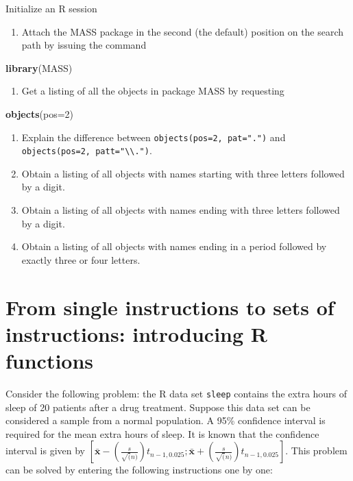 \documentclass[
]{book}
\newenvironment{Shaded}{\begin{snugshade}}{\end{snugshade}}
\newcommand{\AttributeTok}[1]{\textcolor[rgb]{0.13,0.29,0.53}{#1}}
\newcommand{\DecValTok}[1]{\textcolor[rgb]{0.00,0.00,0.81}{#1}}
\newcommand{\FunctionTok}[1]{\textcolor[rgb]{0.13,0.29,0.53}{\textbf{#1}}}
\newcommand{\NormalTok}[1]{#1}
\providecommand{\tightlist}{%
  \setlength{\itemsep}{0pt}\setlength{\parskip}{0pt}}
\begin{document}
Initialize an R session

\begin{enumerate}
\def\labelenumi{(\alph{enumi})}
\tightlist
\item
  Attach the MASS package in the second (the default) position on the search path by issuing the command
\end{enumerate}

\begin{Shaded}
\begin{Highlighting}[]
\FunctionTok{library}\NormalTok{(MASS)}
\end{Highlighting}
\end{Shaded}

\begin{enumerate}
\def\labelenumi{(\alph{enumi})}
\setcounter{enumi}{1}
\tightlist
\item
  Get a listing of all the objects in package MASS by requesting
\end{enumerate}

\begin{Shaded}
\begin{Highlighting}[]
\FunctionTok{objects}\NormalTok{(}\AttributeTok{pos=}\DecValTok{2}\NormalTok{)}
\end{Highlighting}
\end{Shaded}

\begin{enumerate}
\def\labelenumi{(\alph{enumi})}
\setcounter{enumi}{2}
\tightlist
\item
  Explain the difference between \texttt{objects(pos=2,\ pat=".")} and \texttt{objects(pos=2,\ patt="\textbackslash{}\textbackslash{}.")}.
\item
  Obtain a listing of all objects with names starting with three letters followed by a digit.
\item
  Obtain a listing of all objects with names ending with three letters followed by a digit.
\item
  Obtain a listing of all objects with names ending in a period followed by exactly three or four letters.
\end{enumerate}

\section{From single instructions to sets of instructions: introducing R functions}\label{FunctionIntro}

Consider the following problem: the R data set \texttt{sleep} contains the extra hours of sleep of 20 patients after a drug treatment. Suppose this data set can be considered a sample from a normal population. A 95\% confidence interval is required for the mean extra hours of sleep. It is known that the confidence interval is given by \(\left[ \mathbf{\bar{x}}- \left( \frac{s}{\sqrt(n)} \right) t_{n-1,0.025}; \mathbf{\bar{x}}+ \left( \frac{s}{\sqrt(n)} \right) t_{n-1,0.025} \right]\). This problem can be solved by entering the following instructions one by one:
\end{document}
